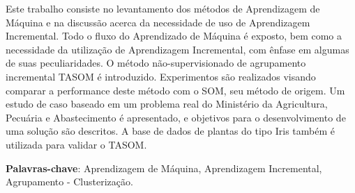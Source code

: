 \begin{resumo}
Este trabalho consiste no levantamento dos métodos de Aprendizagem de Máquina e na discussão acerca da necessidade de uso de Aprendizagem Incremental. Todo o fluxo do Aprendizado de Máquina é exposto, bem como a necessidade da utilização de Aprendizagem Incremental, com ênfase em algumas de suas peculiaridades. O método não-supervisionado de agrupamento incremental TASOM é introduzido. Experimentos são realizados visando comparar a performance deste método com o SOM, seu método de origem. Um estudo de caso baseado em um problema real do Ministério da Agricultura, Pecuária e Abastecimento é apresentado, e objetivos para o desenvolvimento de uma solução são descritos. A base de dados de plantas do tipo Iris também é utilizada para validar o TASOM.


\vspace{\onelineskip}
    
 \noindent
 \textbf{Palavras-chave}: Aprendizagem de Máquina, Aprendizagem Incremental, Agrupamento - Clusterização.

\end{resumo}
